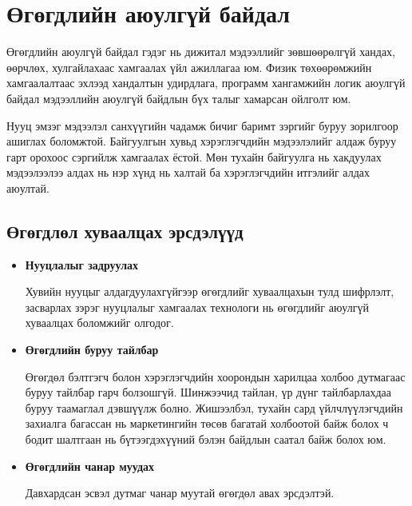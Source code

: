 \section{Өгөгдлийн аюулгүй байдал}

Өгөгдлийн аюулгүй байдал гэдэг нь дижитал мэдээллийг зөвшөөрөлгүй хандах, өөрчлөх, хулгайлахаас хамгаалах үйл ажиллагаа юм. Физик төхөөрөмжийн хамгаалалтаас эхлээд хандалтын удирдлага, программ хангамжийн логик аюулгүй байдал мэдээллийн аюулгүй байдлын бүх талыг хамарсан ойлголт юм. \cite{IBMSecureData}

Нууц эмзэг мэдээлэл санхүүгийн чадамж бичиг баримт зэргийг буруу зорилгоор ашиглах боломжтой.
Байгуулгын хувьд хэрэглэгчдийн мэдээлэлийг алдаж буруу гарт орохоос сэргийлж хамгаалах ёстой. Мөн тухайн байгуулга нь хакдуулах мэдээлээлээ алдах нь нэр хүнд нь халтай ба хэрэглэгчдийн итгэлийг алдах аюултай.

\subsection{Өгөгдлөл хуваалцах эрсдэлүүд}

\begin{itemize}
    \item \textbf{Нууцлалыг задруулах}

    Хувийн нууцыг алдагдуулахгүйгээр өгөгдлийг хуваалцахын тулд шифрлэлт, засварлах зэрэг нууцлалыг хамгаалах технологи нь өгөгдлийг аюулгүй хуваалцах боломжийг олгодог.
    \item \textbf{Өгөгдлийн буруу тайлбар}
    
    Өгөгдөл бэлтгэгч болон хэрэглэгчдийн хоорондын харилцаа холбоо дутмагаас буруу тайлбар гарч болзошгүй. Шинжээчид тайлан, үр дүнг тайлбарлахдаа буруу таамаглал дэвшүүлж болно. Жишээлбэл, тухайн сард үйлчлүүлэгчдийн захиалга багассан нь маркетингийн төсөв багатай холбоотой байж болох ч бодит шалтгаан нь бүтээгдэхүүний бэлэн байдлын саатал байж болох юм.
    \item \textbf{Өгөгдлийн чанар муудах}
    
    Давхардсан эсвэл дутмаг чанар муутай өгөгдөл авах эрсдэлтэй.
\end{itemize}

